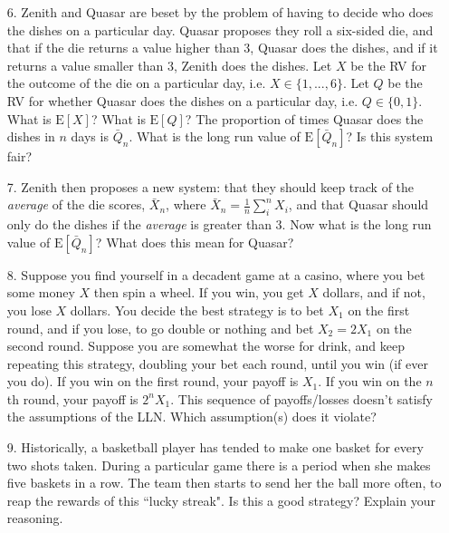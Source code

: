 \documentclass[10pt]{extarticle}
\newcommand{\E}{\text{E}}
\begin{document}
\begin{itemize}

	\item[6.] Zenith and Quasar are beset by the problem of having to decide who does the dishes on a particular day. Quasar proposes they roll a six-sided die, and that if the die returns a value higher than 3, Quasar does the dishes, and if it returns a value smaller than 3, Zenith does the dishes. Let $X$ be the RV for the outcome of the die on a particular day, i.e. $X \in \{1,...,6\}$. Let $Q$ be the RV for whether Quasar does the dishes on a particular day, i.e. $Q \in \{0,1 \}$. What is $\E[X]$? What is $\E[Q]$? The proportion of times Quasar does the dishes in $n$ days is $\bar Q_n$. What is the long run value of $\E[\bar Q_n]$? Is this system fair? \\ 

	\item[7.] Zenith then proposes a new system: that they should keep track of the {\it average} of the die scores, $\bar X_n$, where $\bar X_n = \frac 1n \sum_i^n  X_i$, and that Quasar should only do the dishes if the {\it average} is greater than 3. Now what is the long run value of $\E[\bar Q_n]$? What does this mean for Quasar? \\ 

	\item[8.] Suppose you find yourself in a decadent game at a casino, where you bet some money $X$ then spin a wheel. If you win, you get $X$ dollars, and if not, you lose $X$ dollars. You decide the best strategy is to bet $X_1$ on the first round, and if you lose, to go double or nothing and bet $X_2 = 2X_1$ on the second round. Suppose you are somewhat the worse for drink, and keep repeating this strategy, doubling your bet each round, until you win (if ever you do). If you win on the first round, your payoff is $X_1$. If you win on the $n$th  round, your payoff is $2^n X_1$. This sequence of payoffs/losses doesn't satisfy the assumptions of the LLN. Which assumption(s) does it violate? \\ 

	\item[9.] Historically, a basketball player has tended to make one basket for every two shots taken. During a particular game there is a period when she makes five baskets in a row. The team then starts to send her the ball more often, to reap the rewards of this ``lucky streak". Is this a good strategy? Explain your reasoning.  

\end{itemize}
\end{document}
